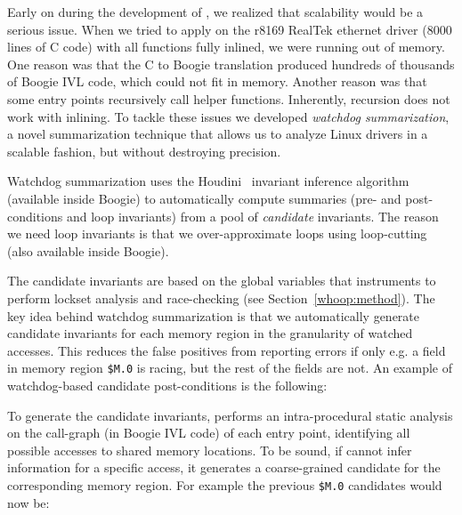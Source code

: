 Early on during the development of \whoop, we realized that scalability would be a serious issue. When we tried to apply \whoop on the r8169 RealTek ethernet driver (8000 lines of C code) with all functions fully inlined, we were running out of memory. One reason was that the C to Boogie translation produced hundreds of thousands of Boogie IVL code, which could not fit in memory. Another reason was that some entry points recursively call helper functions. Inherently, recursion does not work with inlining. To tackle these issues we developed \emph{watchdog summarization}, a novel summarization technique that allows us to analyze Linux drivers in a scalable fashion, but without destroying precision.

Watchdog summarization uses the Houdini~\cite{flanagan2001houdini} invariant inference algorithm (available inside Boogie) to automatically compute summaries (pre- and post-conditions and loop invariants) from a pool of \emph{candidate} invariants. The reason we need loop invariants is that we over-approximate loops using loop-cutting (also available inside Boogie).

The candidate invariants are based on the global variables that \whoop instruments to perform lockset analysis and race-checking (see Section~\ref{whoop:method}). The key idea behind watchdog summarization is that we automatically generate candidate invariants for each memory region in the granularity of watched accesses. This reduces the false positives from reporting errors if only e.g. a field in memory region \texttt{\$M.0} is racing, but the rest of the fields are not. An example of watchdog-based candidate post-conditions is the following:


To generate the candidate invariants, \whoop performs an intra-procedural static analysis on the call-graph (in Boogie IVL code) of each entry point, identifying all possible accesses to shared memory locations. To be sound, if \whoop cannot infer information for a specific access, it generates a coarse-grained candidate for the corresponding memory region. For example the previous \texttt{\$M.0} candidates would now be:

